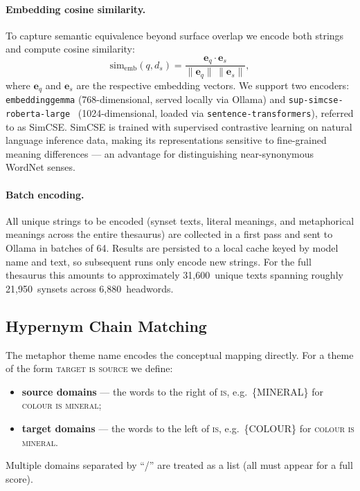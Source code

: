 \documentclass[11pt,a4paper]{article}
\begin{document}
\paragraph{Embedding cosine similarity.}
To capture semantic equivalence beyond surface overlap we encode both
strings and compute cosine similarity:
\begin{equation}
  \mathrm{sim}_{\mathrm{emb}}(q, d_s)
    = \frac{\mathbf{e}_q \cdot \mathbf{e}_s}
           {\|\mathbf{e}_q\|\,\|\mathbf{e}_s\|},
\end{equation}
where $\mathbf{e}_q$ and $\mathbf{e}_s$ are the respective embedding vectors.
We support two encoders: \texttt{embeddinggemma} (768-dimensional, served
locally via Ollama) and \texttt{sup-simcse-roberta-large}~\cite{gao2021simcse}
(1024-dimensional, loaded via \texttt{sentence-transformers}), referred to as
SimCSE.
SimCSE is trained with supervised contrastive learning on natural language
inference data, making its representations sensitive to fine-grained meaning
differences — an advantage for distinguishing near-synonymous WordNet senses.

\paragraph{Batch encoding.}
All unique strings to be encoded (synset texts, literal meanings, and
metaphorical meanings across the entire thesaurus) are collected in a
first pass and sent to Ollama in batches of 64.
Results are persisted to a local cache keyed by model name and text, so
subsequent runs only encode new strings.
For the full thesaurus this amounts to approximately 31,600~unique texts
spanning roughly 21,950~synsets across 6,880~headwords.

\subsection{Hypernym Chain Matching}
\label{subsec:hypernym}

The metaphor theme name encodes the conceptual mapping directly.
For a theme of the form \textsc{target is source} we define:
\begin{itemize}
  \item \textbf{source domains} — the words to the right of \textsc{is},
    e.g.\ \{MINERAL\} for \textsc{colour is mineral};
  \item \textbf{target domains} — the words to the left of \textsc{is},
    e.g.\ \{COLOUR\} for \textsc{colour is mineral}.
\end{itemize}
Multiple domains separated by ``/'' are treated as a list (all must appear
for a full score).
\end{document}
